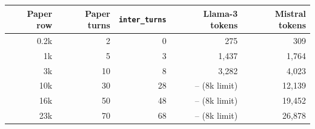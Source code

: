 \begin{tabular}{rrrrr}
\toprule
Paper row & Paper turns & \texttt{inter\_turns} & Llama-3 tokens & Mistral tokens \\
\midrule
0.2k & 2 & 0 & 275 & 309 \\
1k & 5 & 3 & 1,437 & 1,764 \\
3k & 10 & 8 & 3,282 & 4,023 \\
10k & 30 & 28 & -- (8k limit) & 12,139 \\
16k & 50 & 48 & -- (8k limit) & 19,452 \\
23k & 70 & 68 & -- (8k limit) & 26,878 \\
\bottomrule
\end{tabular}
